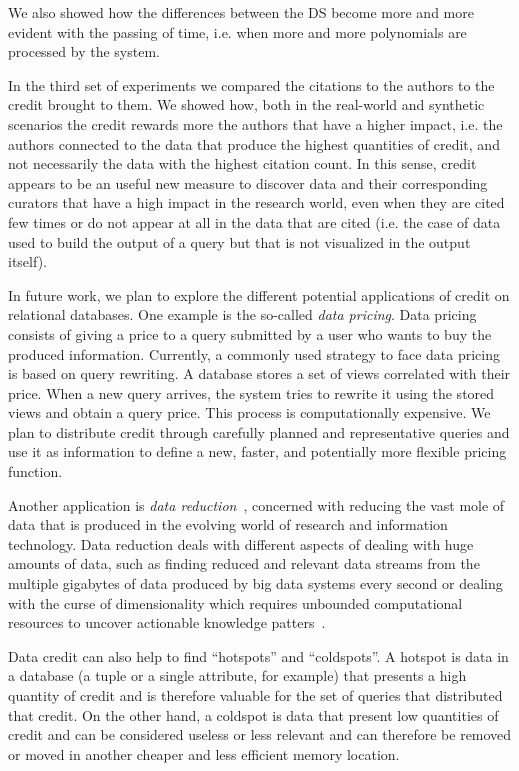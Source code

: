 We also showed how the differences between the DS become more and more evident with the passing of time, i.e. when more and more polynomials are processed by the system.

In the third set of experiments we compared the citations to the authors to the credit brought to them. We showed how, both in the real-world and synthetic scenarios the credit rewards more the authors that have a higher impact, i.e. the authors connected to the data that produce the highest quantities of credit, and not necessarily the data with the highest citation count. 
In this sense, credit appears to be an useful new measure to discover data and their corresponding curators that have a high impact in the research world, even when they are cited few times or do not appear at all in the data that are cited (i.e. the case of data used to build the output of a query but that is not visualized in the output itself).

In future work, we plan to explore the different potential applications of credit on relational databases.
One example is the so-called \emph{data pricing}. Data pricing consists of giving a price to a query submitted by a user who wants to buy the produced information. Currently, a commonly used strategy to face data pricing is based on query rewriting. A database stores a set of views correlated with their price. When a new query arrives, the system tries to rewrite it using the stored views and obtain a query price. This process is computationally expensive.
We plan to distribute credit through carefully planned and representative queries and use it as information to define a new, faster, and potentially more flexible pricing function.

Another application is \emph{data reduction}~\cite{milo2019getting}, concerned with reducing the vast mole of data that is produced in the evolving world of research and information technology. Data reduction deals with different aspects of dealing with huge amounts of data, such as finding reduced and relevant data streams from the multiple gigabytes of data produced by big data systems every second or dealing with the curse of dimensionality which requires unbounded computational resources to uncover actionable knowledge patters~\citep{ur2016big}.

Data credit can also help to find ``hotspots'' and ``coldspots''. A hotspot is data in a database (a tuple or a single attribute, for example) that presents a high quantity of credit and is therefore valuable for the set of queries that distributed that credit. 
On the other hand, a coldspot is data that present low quantities of credit and can be considered useless or less relevant and can therefore be removed or moved in another cheaper and less efficient memory location. 
